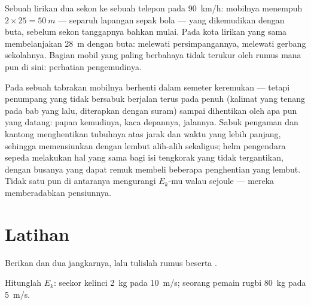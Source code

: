 \begin{example}\label{ex:g9:kinetic-energy-safety:glance}
Sebuah lirikan dua sekon ke sebuah telepon pada \qty{90}{km/h}:
mobilnya menempuh $2 \times 25 = \qty{50}{m}$ --- separuh lapangan
sepak bola --- yang dikemudikan dengan buta, sebelum sekon tanggapnya
bahkan mulai. Pada  kota lirikan yang sama membelanjakan
\qty{28}{m} dengan buta: melewati persimpangannya, melewati gerbang
sekolahnya. Bagian mobil yang paling berbahaya tidak terukur oleh
rumus mana pun di sini: perhatian pengemudinya.
\end{example}

\begin{remark}\label{rem:g9:kinetic-energy-safety:belts}
Pada sebuah tabrakan mobilnya berhenti dalam semeter keremukan ---
tetapi penumpang yang tidak bersabuk berjalan terus pada 
penuh (kalimat yang tenang pada bab yang lalu, diterapkan dengan
suram) sampai dihentikan oleh apa pun yang datang: papan kemudinya,
kaca depannya, jalannya. Sabuk pengaman dan kantong  menghentikan
tubuhnya atas jarak dan waktu yang lebih panjang, sehingga
memensiunkan  dengan lembut alih-alih sekaligus; helm
pengendara sepeda melakukan hal yang sama bagi isi tengkorak yang tidak
tergantikan, dengan busanya yang dapat remuk membeli beberapa
 penghentian yang lembut. Tidak satu pun di antaranya
mengurangi $E_k$-mu walau sejoule --- mereka memberadabkan pensiunnya.
\end{remark}

\section{Latihan}

\begin{exercise}[$\star$]\label{exo:g9:kinetic-energy-safety:1}
Berikan   dan dua jangkarnya, lalu tulislah rumus  beserta .
\end{exercise}

\begin{exercise}[$\star$]\label{exo:g9:kinetic-energy-safety:2}
Hitunglah $E_k$: seekor kelinci \qty{2}{kg} pada \qty{10}{m/s}; seorang
pemain rugbi \qty{80}{kg} pada \qty{5}{m/s}.
\end{exercise}

